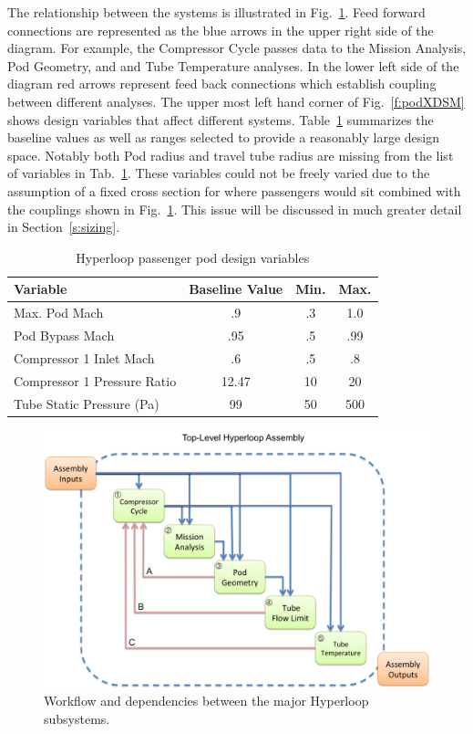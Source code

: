 \documentclass[heading.tex]{subfiles}
\begin{document}
The relationship between the systems is illustrated in Fig.~\ref{f:hyperloopXDSM}. Feed forward connections 
are represented as the blue arrows in the upper right side of the diagram. For example, the Compressor Cycle 
passes data to the Mission Analysis, Pod Geometry, and and Tube Temperature analyses. In the lower left 
side of the diagram red arrows represent feed back connections which establish coupling between different 
analyses. The upper most left hand corner of Fig.~\ref{f:podXDSM} shows design variables that affect 
different systems. Table~\ref{tab:desvars} summarizes the baseline values as well as ranges selected 
to provide a reasonably large design space. Notably both Pod radius and travel tube radius are missing 
from the list of variables in Tab.~\ref{tab:desvars}. These variables could not be freely varied 
due to the assumption of a fixed cross section for where passengers would sit combined with the couplings 
shown in Fig.~\ref{f:hyperloopXDSM}. This issue will be discussed in much greater detail in Section~\ref{s:sizing}.

\begin{table}
    \centering
    \caption{Hyperloop passenger pod design variables}
    \label{tab:desvars}
    \begin{tabular}{l  c  c  c} 
        \hline
        Variable & Baseline Value & Min. & Max. \\ \hline 
        Max. Pod Mach & .9 & .3 & 1.0 \\ 
        Pod Bypass Mach & .95 & .5 & .99 \\
        Compressor 1 Inlet Mach & .6 & .5 & .8 \\ 
        Compressor 1 Pressure Ratio & 12.47 & 10 & 20 \\ 
        Tube Static Pressure (Pa) & 99 & 50 & 500 \\ \hline
    \end{tabular}
\end{table}

\begin{figure}[hbtp]
\centering
\includegraphics[width=\textwidth]{images/TopAssembly.png}
\caption{Workflow and dependencies between the major Hyperloop subsystems.}
\label{f:hyperloopXDSM}
\end{figure}
\end{document}
